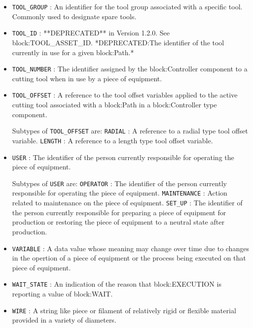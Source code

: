 \begin{itemize}
\item \texttt{TOOL_GROUP} : An identifier for the tool group associated with a specific tool. Commonly used to designate spare tools. 

\item \texttt{TOOL_ID} : **DEPRECATED** in Version 1.2.0.   See {block:TOOL_ASSET_ID}. *DEPRECATED:The identifier of the tool currently in use for a given {block:Path}.* 

\item \texttt{TOOL_NUMBER} : The identifier assigned by the {block:Controller} component to a cutting tool when in use by a piece of equipment. 

\item \texttt{TOOL_OFFSET} : A reference to the tool offset variables applied to the active cutting tool associated with a {block:Path} in a {block:Controller} type component. 

Subtypes of \texttt{TOOL_OFFSET} are: 
\newline\tab \texttt{RADIAL} : A reference to a radial type tool offset variable. 
\newline\tab \texttt{LENGTH} : A reference to a length type tool offset variable. 
\item \texttt{USER} : The identifier of the person currently responsible for operating the piece of equipment. 

Subtypes of \texttt{USER} are: 
\newline\tab \texttt{OPERATOR} : The identifier of the person currently responsible for operating the piece of equipment. 
\newline\tab \texttt{MAINTENANCE} : Action related to maintenance on the piece of equipment. 
\newline\tab \texttt{SET_UP} : The identifier of the person currently responsible for preparing a piece of equipment for production or restoring the piece of equipment to a neutral state after production. 
\item \texttt{VARIABLE} : A data value whose meaning may change over time due to changes in the opertion of a piece of equipment or the process being executed on that piece of equipment. 

\item \texttt{WAIT_STATE} : An indication of the reason that {block:EXECUTION} is reporting a value of {block:WAIT}. 

\item \texttt{WIRE} : A string like piece or filament of relatively rigid or flexible material provided in a variety of diameters. 


\end{itemize}
